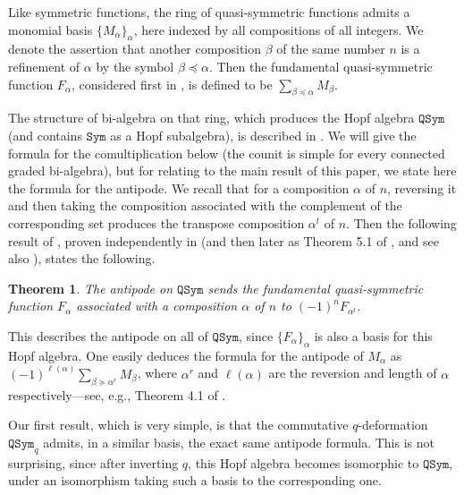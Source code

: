 \documentclass{article}
\newtheorem*{thmnn}{Theorem}
\theoremstyle{definition}
\begin{document}
Like symmetric functions, the ring of quasi-symmetric functions admits a monomial basis $\{M_{\alpha}\}_{\alpha}$, here indexed by all compositions of all integers. We denote the assertion that another composition $\beta$ of the same number $n$ is a refinement of $\alpha$ by the symbol $\beta\preceq\alpha$. Then the fundamental quasi-symmetric function $F_{\alpha}$, considered first in \cite{[Ge]}, is defined to be $\sum_{\beta\preceq\alpha}M_{\beta}$.

The structure of bi-algebra on that ring, which produces the Hopf algebra $\mathtt{QSym}$ (and contains $\mathtt{Sym}$ as a Hopf subalgebra), is described in \cite{[MR]}. We will give the formula for the comultiplication below (the counit is simple for every connected graded bi-algebra), but for relating to the main result of this paper, we state here the formula for the antipode. We recall that for a composition $\alpha$ of $n$, reversing it and then taking the composition associated with the complement of the corresponding set produces the transpose composition $\alpha^{t}$ of $n$. Then the following result of \cite{[MR]}, proven independently in \cite{[E]} (and then later as Theorem 5.1 of \cite{[BS]}, and see also \cite{[Gr]}), states the following.
\begin{thmnn}
The antipode on $\mathtt{QSym}$ sends the fundamental quasi-symmetric function $F_{\alpha}$ associated with a composition $\alpha$ of $n$ to $(-1)^{n}F_{\alpha^{t}}$.
\end{thmnn}
This describes the antipode on all of $\mathtt{QSym}$, since $\{F_{\alpha}\}_{\alpha}$ is also a basis for this Hopf algebra. One easily deduces the formula for the antipode of $M_{\alpha}$ as $(-1)^{\ell(\alpha)}\sum_{\beta\succeq\alpha^{r}}M_{\beta}$, where $\alpha^{r}$ and $\ell(\alpha)$ are the reversion and length of $\alpha$ respectively---see, e.g., Theorem 4.1 of \cite{[BS]}.

\medskip

Our first result, which is very simple, is that the commutative $q$-deformation $\mathtt{QSym}_{q}$ admits, in a similar basis, the exact same antipode formula. This is not surprising, since after inverting $q$, this Hopf algebra becomes isomorphic to $\mathtt{QSym}$, under an isomorphism taking such a basis to the corresponding one.
\end{document}
